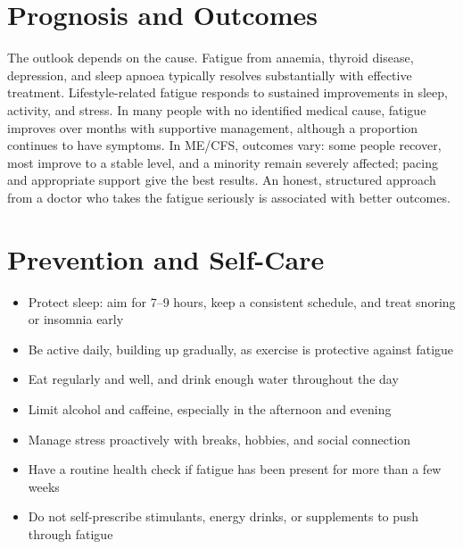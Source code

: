\section*{Prognosis and Outcomes}
The outlook depends on the cause. Fatigue from anaemia, thyroid disease, depression, and sleep apnoea typically resolves substantially with effective treatment. Lifestyle-related fatigue responds to sustained improvements in sleep, activity, and stress. In many people with no identified medical cause, fatigue improves over months with supportive management, although a proportion continues to have symptoms. In ME/CFS, outcomes vary: some people recover, most improve to a stable level, and a minority remain severely affected; pacing and appropriate support give the best results. An honest, structured approach from a doctor who takes the fatigue seriously is associated with better outcomes.

\section*{Prevention and Self-Care}
\begin{itemize}
    \item Protect sleep: aim for 7--9 hours, keep a consistent schedule, and treat snoring or insomnia early
    \item Be active daily, building up gradually, as exercise is protective against fatigue
    \item Eat regularly and well, and drink enough water throughout the day
    \item Limit alcohol and caffeine, especially in the afternoon and evening
    \item Manage stress proactively with breaks, hobbies, and social connection
    \item Have a routine health check if fatigue has been present for more than a few weeks
    \item Do not self-prescribe stimulants, energy drinks, or supplements to push through fatigue
\end{itemize}

